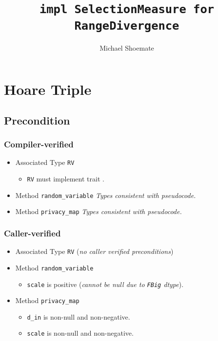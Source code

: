\documentclass{article}
\title{\texttt{impl SelectionMeasure for RangeDivergence}}
\author{Michael Shoemate}
\begin{document}
  
\maketitle 
 
\section{Hoare Triple} 
\subsection*{Precondition} 
\subsubsection*{Compiler-verified}
\begin{itemize}
    \item Associated Type \texttt{RV}
        \begin{itemize}
            \item \texttt{RV} must implement trait .
        \end{itemize}
    \item Method \texttt{random\_variable}
        \textit{Types consistent with pseudocode.}
    \item Method \texttt{privacy\_map}
        \textit{Types consistent with pseudocode.}
\end{itemize}

\subsubsection*{Caller-verified}
\begin{itemize}
    \item Associated Type \texttt{RV} (\textit{no caller verified preconditions})
    \item Method \texttt{random\_variable}
        \begin{itemize}
            \item \texttt{scale} is positive (\textit{cannot be null due to \texttt{FBig} dtype}).
        \end{itemize}
    \item Method \texttt{privacy\_map}
        \begin{itemize}
            \item \texttt{d\_in} is non-null and non-negative.
            \item \texttt{scale} is non-null and non-negative.
        \end{itemize}
\end{itemize}
\end{document}
